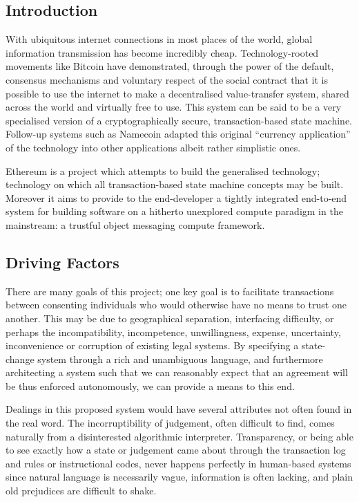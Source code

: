 \documentclass[9pt,oneside]{amsart}
\begin{document}
\setlength{\columnsep}{20pt}
\begin{multicols}{2}

\section{Introduction}\label{sec:introduction}

With ubiquitous internet connections in most places of the world, global information transmission has become incredibly cheap. Technology-rooted movements like Bitcoin have demonstrated, through the power of the default, consensus mechanisms and voluntary respect of the social contract that it is possible to use the internet to make a decentralised value-transfer system, shared across the world and virtually free to use. This system can be said to be a very specialised version of a cryptographically secure, transaction-based state machine. Follow-up systems such as Namecoin adapted this original ``currency application'' of the technology into other applications albeit rather simplistic ones.

Ethereum is a project which attempts to build the generalised technology; technology on which all transaction-based state machine concepts may be built. Moreover it aims to provide to the end-developer a tightly integrated end-to-end system for building software on a hitherto unexplored compute paradigm in the mainstream: a trustful object messaging compute framework.

\subsection{Driving Factors} \label{ch:driving}

There are many goals of this project; one key goal is to facilitate transactions between consenting individuals who would otherwise have no means to trust one another. This may be due to geographical separation, interfacing difficulty, or perhaps the incompatibility, incompetence, unwillingness, expense, uncertainty, inconvenience or corruption of existing legal systems. By specifying a state-change system through a rich and unambiguous language, and furthermore architecting a system such that we can reasonably expect that an agreement will be thus enforced autonomously, we can provide a means to this end.

Dealings in this proposed system would have several attributes not often found in the real word. The incorruptibility of judgement, often difficult to find, comes naturally from a disinterested algorithmic interpreter. Transparency, or being able to see exactly how a state or judgement came about through the transaction log and rules or instructional codes, never happens perfectly in human-based systems since natural language is necessarily vague, information is often lacking, and plain old prejudices are difficult to shake.


\end{multicols}
\end{document}
